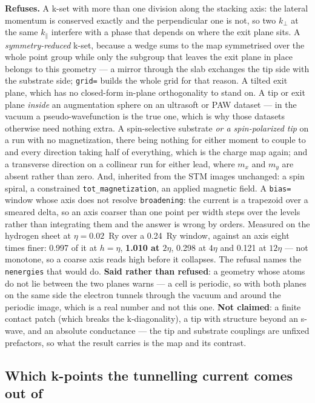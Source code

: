 \documentclass[11pt,a4paper]{article}
\newcommand{\code}[1]{\texttt{\small #1}}
\begin{document}
\begin{refuses}
\textbf{Refuses.} A k-set with more than one division along the stacking axis:
the lateral momentum is conserved exactly and the perpendicular one is not, so
two $k_\perp$ at the same $k_\parallel$ interfere with a phase that depends on
where the exit plane sits. A \emph{symmetry-reduced} k-set, because a wedge sums
to the map symmetrised over the whole point group while only the subgroup that
leaves the exit plane in place belongs to this geometry --- a mirror through the
slab exchanges the tip side with the substrate side; \code{grid=} builds the
whole grid for that reason. A tilted exit plane, which has no closed-form
in-plane orthogonality to stand on. A tip or exit plane \emph{inside} an
augmentation sphere on an ultrasoft or PAW dataset --- in the vacuum a
pseudo-wavefunction is the true one, which is why those datasets otherwise need
nothing extra. A spin-selective substrate \emph{or a spin-polarized
tip} on a run with no magnetization, there being nothing for either moment to
couple to and every direction taking half of everything, which is the charge map
again; and a transverse direction on a collinear run for either lead, where
$m_x$ and $m_y$ are absent rather than zero. And, inherited from the STM images
unchanged: a spin spiral, a constrained \code{tot\_magnetization}, an applied
magnetic field.
A \code{bias=} window whose axis does not resolve \code{broadening}: the current
is a trapezoid over a smeared delta, so an axis coarser than one point per width
steps over the levels rather than integrating them and the answer is wrong by
orders. Measured on the hydrogen sheet at $\eta = 0.02$~Ry over a 0.24~Ry window,
against an axis eight times finer: 0.997 of it at $h = \eta$, \textbf{1.010 at
$2\eta$}, 0.298 at $4\eta$ and 0.121 at $12\eta$ --- not monotone, so a coarse
axis reads high before it collapses. The refusal names the \code{nenergies} that
would do.
\textbf{Said rather than refused}: a geometry whose atoms do not lie between the
two planes warns --- a cell is periodic, so with both planes on the same side
the electron tunnels through the vacuum and around the periodic image, which is
a real number and not this one.
\textbf{Not claimed}: a finite contact patch (which breaks the k-diagonality),
a tip with structure beyond an s-wave, and an absolute conductance --- the tip
and substrate couplings are unfixed prefactors, so what the result carries is
the map and its contrast.
\end{refuses}

\subsection{Which k-points the tunnelling current comes out of}
\end{document}
